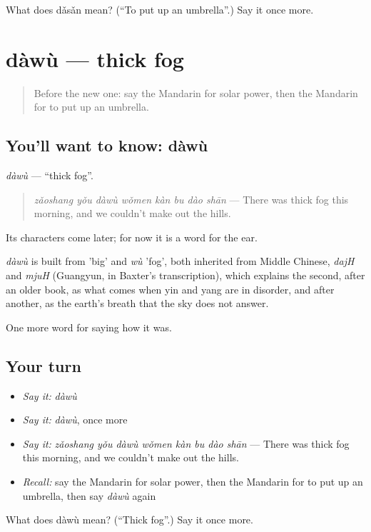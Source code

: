 \begin{tcolorbox}[breakable,colback=teal!4,colframe=teal!35!black,title={Before you move on}]
What does dǎsǎn mean? (\textquotedblleft{}To put up an umbrella\textquotedblright{}.) Say it once more.
\end{tcolorbox}
\section[dàwù]{dàwù — thick fog}

\label{lesson:ZH-C518-dawu}



\begin{quote}
Before the new one: say the Mandarin for solar power, then the Mandarin for to put up an umbrella.
\end{quote}

\subsection*{You'll want to know: dàwù}
\emph{dàwù} — \textquotedblleft{}thick fog\textquotedblright{}.

\begin{quote}
\emph{zǎoshang yǒu dàwù wǒmen kàn bu dào shān} — There was thick fog this morning, and we couldn't make out the hills.
\end{quote}

Its characters come later; for now it is a word for the ear.

\begin{cousinweb}
\emph{dàwù} is built from  'big' and \emph{wù} 'fog', both inherited from Middle Chinese, \emph{dajH} and \emph{mjuH} (Guangyun, in Baxter's transcription), which explains the second, after an older book, as what comes when yin and yang are in disorder, and after another, as the earth's breath that the sky does not answer.
\end{cousinweb}

\begin{grammarlens}[title={What you've built}]
One more word for saying how it was.
\end{grammarlens}

\subsection*{Your turn}
\begin{itemize}
\raggedright
  \item \emph{Say it:} \emph{dàwù}
  \item \emph{Say it:} \emph{dàwù}, once more
  \item \emph{Say it:} \emph{zǎoshang yǒu dàwù wǒmen kàn bu dào shān} — There was thick fog this morning, and we couldn't make out the hills.
  \item \emph{Recall:} say the Mandarin for solar power, then the Mandarin for to put up an umbrella, then say \emph{dàwù} again
\end{itemize}

\begin{tcolorbox}[breakable,colback=teal!4,colframe=teal!35!black,title={Before you move on}]
What does dàwù mean? (\textquotedblleft{}Thick fog\textquotedblright{}.) Say it once more.
\end{tcolorbox}
